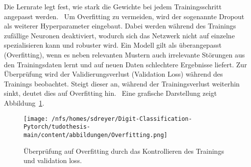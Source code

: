Die Lernrate legt fest, wie stark die Gewichte bei jedem Trainingsschritt angepasst werden.~\cite{Mohammed2024} 
Um Overfitting zu vermeiden, wird der sogenannte Dropout als weiterer Hyperparameter eingebaut.  
Dabei werden während des Trainings zufällige Neuronen deaktiviert, wodurch sich das Netzwerk nicht auf einzelne spezialisieren kann und robuster wird. %
Ein Modell gilt als überangepasst (Overfitting), wenn es neben relevanten Mustern auch irrelevante Störungen aus den Trainingsdaten lernt und auf neuen Daten schlechtere Ergebnisse liefert.  
Zur Überprüfung wird der Validierungsverlust (Validation Loss) während des Trainings beobachtet.  
Steigt dieser an, während der Trainingsverlust weiterhin sinkt, deutet dies auf Overfitting hin.~\cite{Yamashita2018}  
Eine grafische Darstellung zeigt Abbildung~\ref{fig:overfitting}.
\begin{figure}[htbp]
  \centering
  \texttt{[image: /nfs/homes/sdreyer/Digit-Classification-Pytorch/tudothesis-main/content/abbildungen/Overfitting.png]}
  \caption{Überprüfung auf Overfitting durch das Kontrollieren des Trainings und validation loss.~\cite{Yamashita2018}}
  \label{fig:overfitting}
\end{figure}

